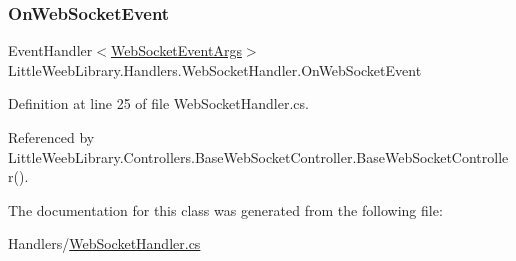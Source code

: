 \subsubsection{\texorpdfstring{On\+Web\+Socket\+Event}{OnWebSocketEvent}}
{\footnotesize\ttfamily Event\+Handler$<$\mbox{\hyperlink{class_little_weeb_library_1_1_event_arguments_1_1_web_socket_event_args}{Web\+Socket\+Event\+Args}}$>$ Little\+Weeb\+Library.\+Handlers.\+Web\+Socket\+Handler.\+On\+Web\+Socket\+Event}



Definition at line 25 of file Web\+Socket\+Handler.\+cs.



Referenced by Little\+Weeb\+Library.\+Controllers.\+Base\+Web\+Socket\+Controller.\+Base\+Web\+Socket\+Controller().



The documentation for this class was generated from the following file\+:\begin{DoxyCompactItemize}
\item 
Handlers/\mbox{\hyperlink{_web_socket_handler_8cs}{Web\+Socket\+Handler.\+cs}}\end{DoxyCompactItemize}
